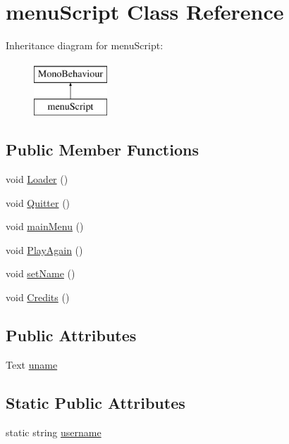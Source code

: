 \hypertarget{classmenu_script}{\section{menu\-Script Class Reference}
\label{classmenu_script}
}
Inheritance diagram for menu\-Script\-:\begin{figure}[H]
\begin{center}
\leavevmode
\includegraphics[height=2.000000cm]{classmenu_script}
\end{center}
\end{figure}
\subsection*{Public Member Functions}
\begin{DoxyCompactItemize}
\item 
void \hyperlink{classmenu_script_ad8b1a2b775439cde293c20cf42c383bf}{Loader} ()
\item 
void \hyperlink{classmenu_script_a741eca3b4ba3e4e9dd70a6d871c0fff3}{Quitter} ()
\item 
void \hyperlink{classmenu_script_a138adad9002137957134de29d5240596}{main\-Menu} ()
\item 
void \hyperlink{classmenu_script_ade6543cb8aaebe9014418bfe89197f18}{Play\-Again} ()
\item 
void \hyperlink{classmenu_script_ab608551ab10281b8f248bc017a3a559b}{set\-Name} ()
\item 
void \hyperlink{classmenu_script_a81ffc41005f93c4dc0382fc94468e385}{Credits} ()
\end{DoxyCompactItemize}
\subsection*{Public Attributes}
\begin{DoxyCompactItemize}
\item 
Text \hyperlink{classmenu_script_a2e1aa02723579f3d35f956147bdb518d}{uname}
\end{DoxyCompactItemize}
\subsection*{Static Public Attributes}
\begin{DoxyCompactItemize}
\item 
static string \hyperlink{classmenu_script_ac884cc3a06860162c4fc9b4672753bc9}{username}
\end{DoxyCompactItemize}


